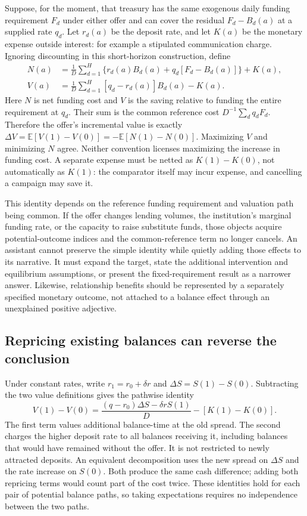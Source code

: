 Suppose, for the moment, that treasury has the same exogenous daily funding
requirement $F_d$ under either offer and can cover the residual $F_d-B_d(a)$
at a supplied rate $q_d$. Let $r_d(a)$ be the deposit rate, and let $K(a)$ be
the monetary expense outside interest: for example a stipulated communication
charge. Ignoring discounting in this short-horizon construction, define
\begin{align}
 N(a)&=\frac1D\sum_{d=1}^H
 \{r_d(a)B_d(a)+q_d[F_d-B_d(a)]\}+K(a),
 \label{exec17:l2-cost}\\
 V(a)&=\frac1D\sum_{d=1}^H[q_d-r_d(a)]B_d(a)-K(a).
 \label{exec17:l2-value}
\end{align}
Here $N$ is net funding cost and $V$ is the saving relative to funding the
entire requirement at $q_d$. Their sum is the common reference cost
$D^{-1}\sum_d q_dF_d$. Therefore the offer's incremental value is exactly
$\Delta V=\mathbb E[V(1)-V(0)]=-\mathbb E[N(1)-N(0)]$.
Maximizing $V$ and minimizing $N$ agree. Neither convention licenses
maximizing the increase in funding cost. A separate expense must be netted
as $K(1)-K(0)$, not automatically as $K(1)$: the comparator itself may incur
expense, and cancelling a campaign may save it.

This identity depends on the reference funding requirement and valuation
path being common. If the offer changes lending volumes, the institution's
marginal funding rate, or the capacity to raise substitute funds, those
objects acquire potential-outcome indices and the common-reference term no
longer cancels. An assistant cannot preserve the simple identity while
quietly adding those effects to its narrative. It must expand the target,
state the additional intervention and equilibrium assumptions, or present
the fixed-requirement result as a narrower answer. Likewise, relationship
benefits should be represented by a separately specified monetary outcome,
not attached to a balance effect through an unexplained positive adjective.

\subsection{Repricing existing balances can reverse the conclusion}

Under constant rates, write $r_1=r_0+\delta r$ and
$\Delta S=S(1)-S(0)$. Subtracting the two value definitions gives the
pathwise identity
\begin{equation}
 V(1)-V(0)=\frac{(q-r_0)\Delta S-\delta r S(1)}D
             -[K(1)-K(0)].
 \label{exec17:l2-decomposition}
\end{equation}
The first term values additional balance-time at the old spread. The second
charges the higher deposit rate to all balances receiving it, including
balances that would have remained without the offer. It is not restricted
to newly attracted deposits. An equivalent decomposition uses the new
spread on $\Delta S$ and the rate increase on $S(0)$. Both produce the same
cash difference; adding both repricing terms would count part of the cost
twice. These identities hold for each pair of potential balance paths, so
taking expectations requires no independence between the two paths.


